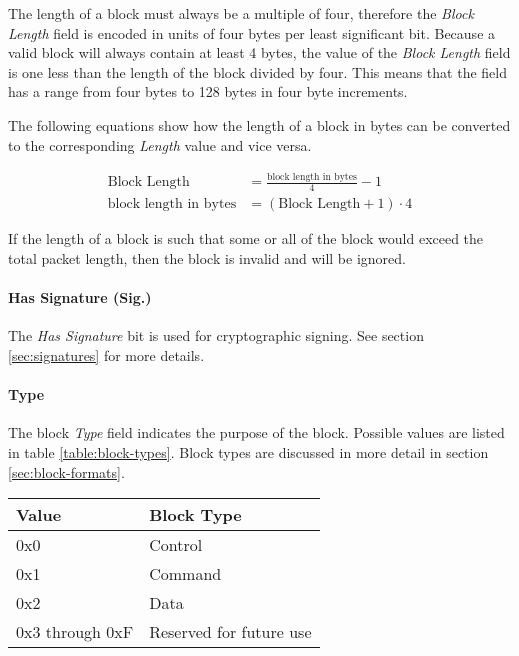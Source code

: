 The length of a block must always be a multiple of four, therefore the \emph{Block Length} field is encoded in units of
four bytes per least significant bit. Because a valid block will always contain at least 4 bytes, the value of the
\emph{Block Length} field is one less than the length of the block divided by four. This means that the field has a
range from four bytes to 128 bytes in four byte increments.

The following equations show how the length of a block in bytes can be converted to the corresponding \emph{Length}
value and vice versa.

\begin{align*}
	\text{Block Length}          & = \frac{\text{block length in bytes}}{4} - 1   \\
	\text{block length in bytes} & = \left(\text{Block Length} + 1\right) \cdot 4
\end{align*}

If the length of a block is such that some or all of the block would exceed the total packet length, then the block is
invalid and will be ignored.

\paragraph{Has Signature (Sig.)}
The \emph{Has Signature} bit is used for cryptographic signing. See section \ref{sec:signatures} for more details.

\paragraph{Type}
The block \emph{Type} field indicates the purpose of the block. Possible values are listed in table
\ref{table:block-types}. Block types are discussed in more detail in section \ref{sec:block-formats}.

\begin{table*}
	\centering
	\begin{tabular}{@{}ll@{}}
		\toprule
		Value           & Block Type              \\
		\midrule
		0x0             & Control                 \\
		0x1             & Command                 \\
		0x2             & Data                    \\
		0x3 through 0xF & Reserved for future use \\
		\bottomrule
	\end{tabular}
	\caption{Block types}
	\label{table:block-types}
\end{table*}

